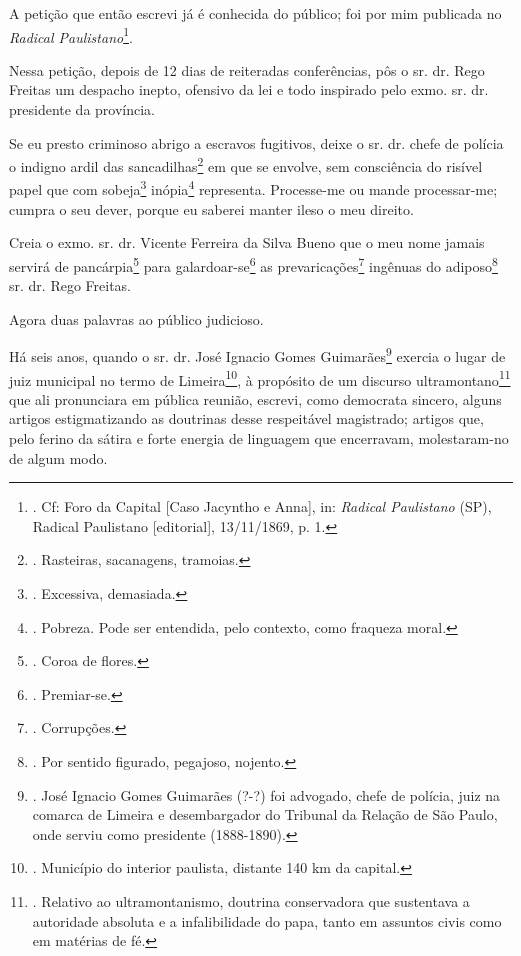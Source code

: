 A petição que então escrevi já é conhecida do público; foi por mim
publicada no \emph{Radical Paulistano}\footnote{. Cf: Foro da Capital
  {[}Caso Jacyntho e Anna{]}, in: \emph{Radical Paulistano} (SP),
  Radical Paulistano {[}editorial{]}, 13/11/1869, p. 1.}.

Nessa petição, depois de 12 dias de reiteradas conferências, pôs o sr.
dr. Rego Freitas um despacho inepto, ofensivo da lei e todo inspirado
pelo exmo. sr. dr. presidente da província.

Se eu presto criminoso abrigo a escravos fugitivos, deixe o sr. dr.
chefe de polícia o indigno ardil das sancadilhas\footnote{. Rasteiras,
  sacanagens, tramoias.} em que se envolve, sem consciência do risível
papel que com sobeja\footnote{. Excessiva, demasiada.} inópia\footnote{.
  Pobreza. Pode ser entendida, pelo contexto, como fraqueza moral.}
representa. Processe-me ou mande processar-me; cumpra o seu dever,
porque eu saberei manter ileso o meu direito.

Creia o exmo. sr. dr. Vicente Ferreira da Silva Bueno que o meu nome
jamais servirá de pancárpia\footnote{. Coroa de flores.} para
galardoar-se\footnote{. Premiar-se.} as prevaricações\footnote{.
  Corrupções.} ingênuas do adiposo\footnote{. Por sentido figurado,
  pegajoso, nojento.} sr. dr. Rego Freitas.

Agora duas palavras ao público judicioso.

Há seis anos, quando o sr. dr. José Ignacio Gomes Guimarães\footnote{.
  José Ignacio Gomes Guimarães (?-?) foi advogado, chefe de polícia,
  juiz na comarca de Limeira e desembargador do Tribunal da Relação de
  São Paulo, onde serviu como presidente (1888-1890).} exercia o lugar
de juiz municipal no termo de Limeira\footnote{. Município do interior
  paulista, distante 140 km da capital.}, à propósito de um discurso
ultramontano\footnote{. Relativo ao ultramontanismo, doutrina
  conservadora que sustentava a autoridade absoluta e a infalibilidade
  do papa, tanto em assuntos civis como em matérias de fé.} que ali
pronunciara em pública reunião, escrevi, como democrata sincero, alguns
artigos estigmatizando as doutrinas desse respeitável magistrado;
artigos que, pelo ferino da sátira e forte energia de linguagem que
encerravam, molestaram-no de algum modo.

